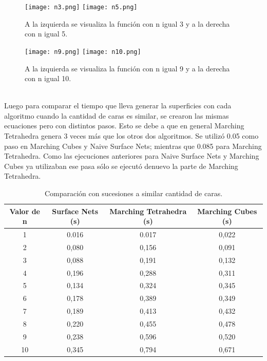\documentclass[12pt]{article}
\begin{document}
\begin{figure}[h!]
\texttt{[image: n3.png]}
\hfill
\texttt{[image: n5.png]}
\caption{ A la izquierda se visualiza la función con n igual 3 y a la derecha con n igual 5.}
\label{ fig : surface }
\end{figure}
\begin{figure}[h!]
\texttt{[image: n9.png]}
\hfill
\texttt{[image: n10.png]}
\caption{ A la izquierda se visualiza la función con n igual 9 y a la derecha con n igual 10.}
\label{ fig : surface }
\end{figure}
\\Luego para comparar el tiempo que lleva generar la superficies con cada algoritmo cuando la cantidad de caras es similar, se crearon las mismas ecuaciones pero con distintos pasos. Esto se debe a que en general Marching Tetrahedra genera 3 veces más que los otros dos algoritmos. Se utilizó 0.05 como paso en Marching Cubes y Naive Surface Nets; mientras que 0.085 para Marching Tetrahedra. Como las ejecuciones anteriores para Naive Surface Nets y Marching Cubes ya utilizaban ese pasa sólo se ejecutó denuevo la parte de Marching Tetrahedra.
\begin{table}[h!]
  \centering
  \label{tab:table1}
  \begin{tabular}{cccc}
    \toprule
    Valor de n & Surface Nets (s) & Marching Tetrahedra (s) & Marching Cubes (s)\\
    \midrule
    1 & 0.016 & 0.017 & 0,022\\
    2 & 0,080 & 0,156 & 0,091\\
    3 & 0,088 & 0,191 & 0,132\\
    4 & 0,196 & 0,288 & 0,311\\
    5 & 0,134 & 0,324 & 0,345\\
    6 & 0,178 & 0,389 & 0,349\\
    7 & 0,189 & 0,413 & 0,432\\
    8 & 0,220 & 0,455 & 0,478\\
    9 & 0,238 & 0,596 & 0,520\\
    10 & 0,345 & 0,794 & 0,671\\
    \bottomrule
  \end{tabular}
  \caption{Comparación con sucesiones a similar cantidad de caras.}
\end{table}
\clearpage
\end{document}
